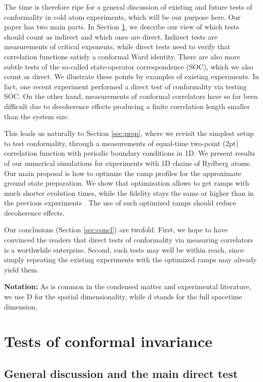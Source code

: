 \documentclass[a4paper,11pt]{article}
\theoremstyle{remark}
\theoremstyle{theorem}
\begin{document}
The time is therefore ripe for a general discussion of existing and future
tests of conformality in cold atom experiments, which will be our purpose
here. Our paper has two main parts. In Section \ref{sec:gen}, we
describe our view of which tests should count as indirect and which ones are
direct. Indirect tests are measurements of critical exponents, while direct
tests need to verify that correlation functions satisfy a conformal Ward
identity. There are also more subtle tests of the so-called state-operator correspondence (SOC), which we also count as direct.
We illustrate these points by examples of existing experiments. In fact, one recent experiment \cite{Sun:2026aqf} performed a direct test of conformality via testing SOC. On the other hand, measurements of conformal correlators have so far been difficult due to decoherence effects producing a finite correlation length smaller than the system size.

This leads us naturally to Section \ref{sec:prop}, where we revisit the simplest setup to test
conformality, through a measurements of equal-time two-point (2pt) correlation
function with periodic boundary conditions in 1D. We present results of
our numerical simulations for experiments with 1D chains of Rydberg atoms. Our main proposal is how to optimize the ramp profiles for the approximate ground state preparation. We show that optimization allows to get ramps with much shorter evolution times, while the fidelity stays the same or higher than in the previous experiments \cite{Fang:2024uyf}.  The use of such optimized ramps should reduce decoherence effects. 

Our conclusions (Section \ref{sec:concl}) are twofold. First, we hope to have convinced the readers that direct tests of conformality via measuring correlators is a worthwhile enterprise. Second, such tests may well be within reach, since simply repeating the existing experiments with the optimized ramps may already yield them.


{\bf Notation:} As is
common in the condensed matter and experimental literature, we use D for the spatial dimensionality, while d stands for the full spacetime dimension, 

\section{Tests of conformal invariance}\label{sec:gen}

\subsection{General discussion and the main direct test}
\end{document}

